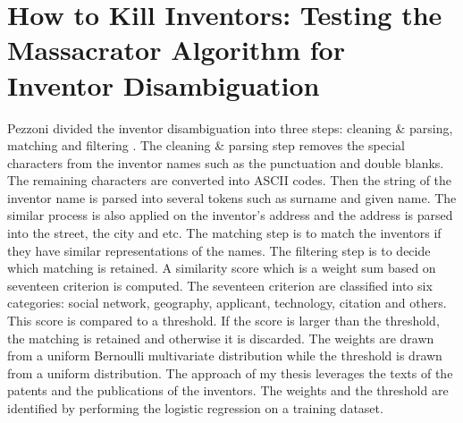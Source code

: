 \section{How to Kill Inventors: Testing the Massacrator Algorithm for Inventor Disambiguation}
Pezzoni divided the inventor disambiguation into three steps: cleaning \& parsing, matching and filtering \cite{RePEc:grt:wpegrt:2012-29}. The cleaning \& parsing step removes the special characters from the inventor names such as the punctuation and double blanks. The remaining characters are converted into ASCII codes. Then the string of the inventor name is parsed into several tokens such as surname and given name. The similar process is also applied on the inventor's address and the address is parsed into the street, the city and etc. The matching step is to match the inventors if they have similar representations of the names. The filtering step is to decide which matching is retained. A similarity score which is a weight sum based on seventeen criterion is computed. The seventeen criterion are classified into six categories: social network, geography, applicant, technology, citation and others.  This score is compared to a threshold. If the score is larger than the threshold, the matching is retained and otherwise it is discarded. The weights are drawn from a uniform Bernoulli multivariate distribution while the threshold is drawn from a uniform distribution. The approach of my thesis leverages the texts of the patents and the publications of the inventors. The weights and the threshold are identified by performing the logistic regression on a training dataset. 


